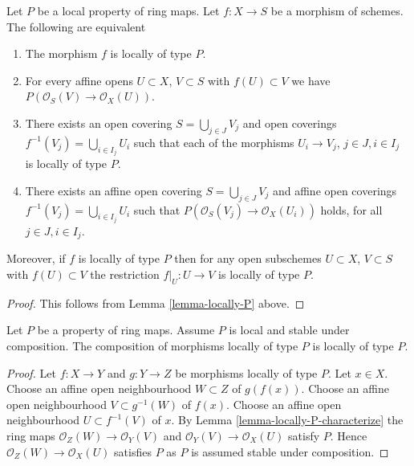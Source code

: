 \begin{lemma}
\label{lemma-locally-P-characterize}
Let $P$ be a local property of ring maps.
Let $f : X \to S$ be a morphism of schemes.
The following are equivalent
\begin{enumerate}
\item The morphism $f$ is locally of type $P$.
\item For every affine opens $U \subset X$, $V \subset S$
with $f(U) \subset V$ we have $P(\mathcal{O}_S(V) \to \mathcal{O}_X(U))$.
\item There exists an open covering $S = \bigcup_{j \in J} V_j$
and open coverings $f^{-1}(V_j) = \bigcup_{i \in I_j} U_i$ such
that each of the morphisms $U_i \to V_j$, $j\in J, i\in I_j$
is locally of type $P$.
\item There exists an affine open covering $S = \bigcup_{j \in J} V_j$
and affine open coverings $f^{-1}(V_j) = \bigcup_{i \in I_j} U_i$ such
that $P(\mathcal{O}_S(V_j) \to \mathcal{O}_X(U_i))$ holds, for all
$j\in J, i\in I_j$.
\end{enumerate}
Moreover, if $f$ is locally of type $P$ then for
any open subschemes $U \subset X$, $V \subset S$ with $f(U) \subset V$
the restriction $f|_U : U \to V$ is locally of type $P$.
\end{lemma}

\begin{proof}
This follows from Lemma \ref{lemma-locally-P} above.
\end{proof}

\begin{lemma}
\label{lemma-composition-type-P}
Let $P$ be a property of ring maps.
Assume $P$ is local and stable under composition.
The composition of morphisms locally of type $P$ is
locally of type $P$.
\end{lemma}

\begin{proof}
Let $f : X \to Y$ and $g : Y \to Z$ be morphisms locally of type $P$.
Let $x \in X$. Choose an affine open neighbourhood $W \subset Z$ of
$g(f(x))$. Choose an affine open neighbourhood $V \subset g^{-1}(W)$
of $f(x)$. Choose an affine open neighbourhood $U \subset f^{-1}(V)$
of $x$. By Lemma \ref{lemma-locally-P-characterize} the ring maps
$\mathcal{O}_Z(W) \to \mathcal{O}_Y(V)$ and
$\mathcal{O}_Y(V) \to \mathcal{O}_X(U)$ satisfy $P$.
Hence $\mathcal{O}_Z(W) \to \mathcal{O}_X(U)$ satisfies $P$
as $P$ is assumed stable under composition.
\end{proof}

